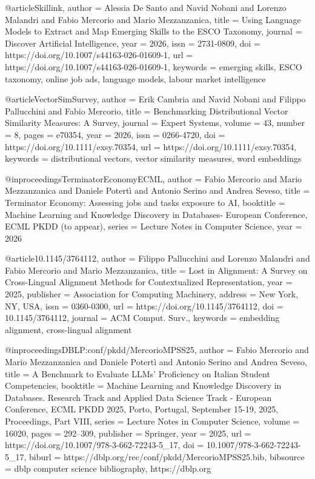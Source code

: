 

@article{Skillink,
  author       = {Alessia De Santo and Navid Nobani and Lorenzo Malandri and Fabio Mercorio and Mario Mezzanzanica},
  title        = {Using Language Models to Extract and Map Emerging Skills to the ESCO Taxonomy},
  journal      = {Discover Artificial Intelligence},
  year         = {2026},
  issn         = {2731-0809},
  doi          = {https://doi.org/10.1007/s44163-026-01609-1},
  url          = {https://doi.org/10.1007/s44163-026-01609-1},
  keywords     = {emerging skills, ESCO taxonomy, online job ads, language models, labour market intelligence}
}

@article{VectorSimSurvey,
  author       = {Erik Cambria and Navid Nobani and Filippo Pallucchini and Fabio Mercorio},
  title        = {Benchmarking Distributional Vector Similarity Measures: A Survey},
  journal      = {Expert Systems},
  volume       = {43},
  number       = {8},
  pages        = {e70354},
  year         = {2026},
  issn         = {0266-4720},
  doi          = {https://doi.org/10.1111/exsy.70354},
  url          = {https://doi.org/10.1111/exsy.70354},
  keywords     = {distributional vectors, vector similarity measures, word embeddings}
}

@inproceedings{TerminatorEconomyECML,
  author       = {Fabio Mercorio and Mario Mezzanzanica and Daniele Potertì and Antonio Serino and Andrea Seveso},
  title        = {Terminator Economy: Assessing jobs and tasks exposure to AI},
  booktitle    = {Machine Learning and Knowledge Discovery in Databases- European Conference, {ECML} {PKDD} (to appear)},
  series       = {Lecture Notes in Computer Science},
  year         = {2026}
}

@article{10.1145/3764112,
author = {Filippo Pallucchini and  Lorenzo Malandri and Fabio Mercorio and Mario Mezzanzanica},
title = {Lost in Alignment: A Survey on Cross-Lingual Alignment Methods for Contextualized Representation},
year = {2025},
publisher = {Association for Computing Machinery},
address = {New York, NY, USA},
issn = {0360-0300},
url = {https://doi.org/10.1145/3764112},
doi = {10.1145/3764112},
journal = {ACM Comput. Surv.},
keywords = {embedding alignment, cross-lingual alignment}
}

@inproceedings{DBLP:conf/pkdd/MercorioMPSS25,
  author       = {Fabio Mercorio and Mario Mezzanzanica and Daniele Potertì and Antonio Serino and Andrea Seveso},
  title        = {A Benchmark to Evaluate LLMs' Proficiency on Italian Student
                  Competencies},
  booktitle    = {Machine Learning and Knowledge Discovery in Databases. Research Track
                  and Applied Data Science Track - European Conference, {ECML} {PKDD}
                  2025, Porto, Portugal, September 15-19, 2025, Proceedings, Part {VIII}},
  series       = {Lecture Notes in Computer Science},
  volume       = {16020},
  pages        = {292--309},
  publisher    = {Springer},
  year         = {2025},
  url          = {https://doi.org/10.1007/978-3-662-72243-5\_17},
  doi          = {10.1007/978-3-662-72243-5\_17},
  biburl       = {https://dblp.org/rec/conf/pkdd/MercorioMPSS25.bib},
  bibsource    = {dblp computer science bibliography, https://dblp.org}
}


